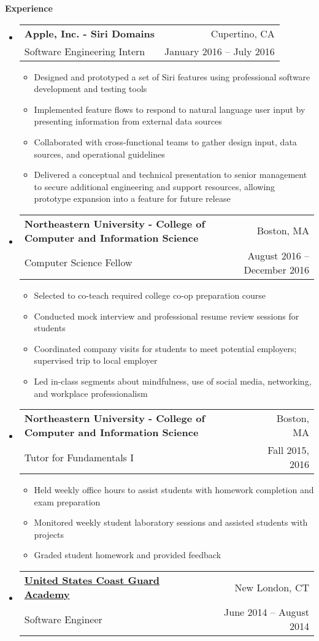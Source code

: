 \documentclass[letterpaper,10.6pt]{article}
\makeatletter
\newcommand{\resitem}[1]{\item #1 \vspace{-2pt}}
\newcommand{\resheading}[1]{{\large \colorbox{mygrey}{\begin{minipage}{\textwidth}{\textbf{#1 \vphantom{p\^{E}}}}\end{minipage}}}}
\newcommand{\ressubheading}[4]{
\begin{tabular*}{6.8in}{l@{\extracolsep{\fill}}r}
		\textbf{#1} & #2 \\
		\small{#3} & \small{#4} \\
\end{tabular*}\vspace{-6pt}}
\makeatother
\begin{document}
\resheading{Experience}
	\begin{itemize}[leftmargin=*]
		\item[]
			\ressubheading{Apple, Inc. - \small{Siri Domains}}{Cupertino, CA}{Software Engineering Intern}{January 2016 -- July 2016}
			{\footnotesize
				\begin{itemize}
					\resitem{Designed and prototyped a set of Siri features using professional software development and testing tools}
					\resitem{Implemented feature flows to respond to natural language user input by presenting information from external data sources}
					\resitem{Collaborated with cross-functional teams to gather design input, data sources, and operational guidelines}
					\resitem{Delivered a conceptual and technical presentation to senior management to secure additional engineering and support resources, allowing prototype expansion into a feature for future release}
				\end{itemize}}
		\item[]
			\ressubheading{Northeastern University - \small{College of Computer and Information Science}}{Boston, MA}{Computer Science Fellow}{August 2016 -- December 2016}
			{\footnotesize
				\begin{itemize}
					\resitem{Selected to co-teach required college co-op preparation course}
					\resitem{Conducted mock interview and professional resume review sessions for students}
					\resitem{Coordinated company visits for students to meet potential employers; supervised trip to local employer}
					\resitem{Led in-class segments about mindfulness, use of social media, networking, and workplace professionalism}
			\end{itemize}}
		\item[]
			\ressubheading{Northeastern University - \small{College of Computer and Information Science}}{Boston, MA}{Tutor for Fundamentals I}{Fall 2015, 2016}
			{\footnotesize
				\begin{itemize}
					\resitem{Held weekly office hours to assist students with homework completion and exam preparation}
					\resitem{Monitored weekly student laboratory sessions and assisted students with projects}
					\resitem{Graded student homework and provided feedback}
				\end{itemize}}
		\item[] 
			\ressubheading{\href{http://www.uscga.edu}{United States Coast Guard Academy}}{New London, CT}
				{Software Engineer}{June 2014 -- August 2014}
				{\footnotesize
				\begin{itemize}

\end{itemize}}
\end{itemize}
\end{document}
